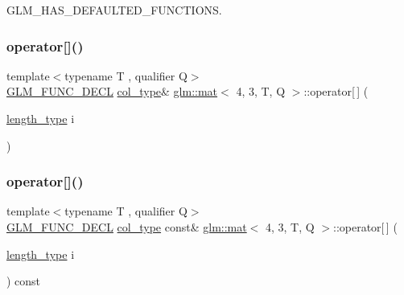 G\+L\+M\+\_\+\+H\+A\+S\+\_\+\+D\+E\+F\+A\+U\+L\+T\+E\+D\+\_\+\+F\+U\+N\+C\+T\+I\+O\+NS. 

\mbox{\label{structglm_1_1mat_3_014_00_013_00_01_t_00_01_q_01_4_a35ef287c1963b05945a5bb159ff3ac70}} 
\subsubsection{\texorpdfstring{operator[]()}{operator[]()}\hspace{0.1cm}{\footnotesize\ttfamily [1/2]}}
{\footnotesize\ttfamily template$<$typename T , qualifier Q$>$ \\
\hyperlink{setup_8hpp_ab2d052de21a70539923e9bcbf6e83a51}{G\+L\+M\+\_\+\+F\+U\+N\+C\+\_\+\+D\+E\+CL} \hyperlink{structglm_1_1mat_3_014_00_013_00_01_t_00_01_q_01_4_ab7cb76d6290691108c8af724270e3b6c}{col\+\_\+type}\& \hyperlink{structglm_1_1mat}{glm\+::mat}$<$ 4, 3, T, Q $>$\+::operator\mbox{[}$\,$\mbox{]} (\begin{DoxyParamCaption}\item[{\hyperlink{structglm_1_1mat_3_014_00_013_00_01_t_00_01_q_01_4_a24f0f2085bebe0a6e79da267368e74f5}{length\+\_\+type}}]{i }\end{DoxyParamCaption})}

\mbox{\label{structglm_1_1mat_3_014_00_013_00_01_t_00_01_q_01_4_aaad4f07304cb7a1d857251e6cb39063a}} 
\subsubsection{\texorpdfstring{operator[]()}{operator[]()}\hspace{0.1cm}{\footnotesize\ttfamily [2/2]}}
{\footnotesize\ttfamily template$<$typename T , qualifier Q$>$ \\
\hyperlink{setup_8hpp_ab2d052de21a70539923e9bcbf6e83a51}{G\+L\+M\+\_\+\+F\+U\+N\+C\+\_\+\+D\+E\+CL} \hyperlink{structglm_1_1mat_3_014_00_013_00_01_t_00_01_q_01_4_ab7cb76d6290691108c8af724270e3b6c}{col\+\_\+type} const\& \hyperlink{structglm_1_1mat}{glm\+::mat}$<$ 4, 3, T, Q $>$\+::operator\mbox{[}$\,$\mbox{]} (\begin{DoxyParamCaption}\item[{\hyperlink{structglm_1_1mat_3_014_00_013_00_01_t_00_01_q_01_4_a24f0f2085bebe0a6e79da267368e74f5}{length\+\_\+type}}]{i }\end{DoxyParamCaption}) const}



